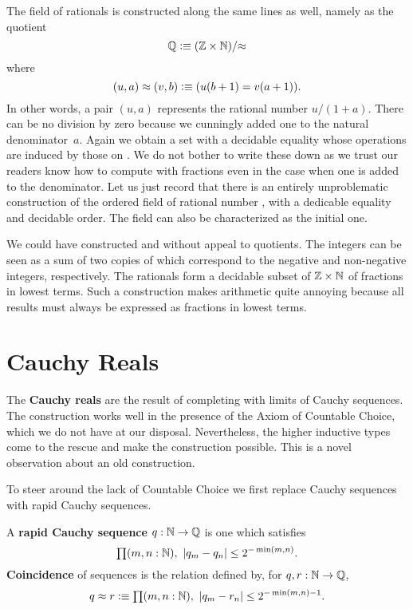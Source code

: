The field of rationals \Q is constructed along the same lines as well, namely as the
quotient
%
\[ \mathbb{Q} \vcentcolon\equiv (\mathbb{Z} \times \mathbb{N})/{\approx} \]
%
where
\[ (u,a) \approx (v,b) \vcentcolon\equiv (u (b + 1) = v (a + 1)). \]
%
In other words, a pair $(u, a)$ represents the rational number $u / (1 + a)$. There can be
no division by zero because we cunningly added one to the natural denominator~$a$. Again
we obtain a set with a decidable equality whose operations are induced by those on \Z. We
do not bother to write these down as we trust our readers know how to compute with
fractions even in the case when one is added to the denominator. Let us just record that
there is an entirely unproblematic construction of the ordered field of rational number
\Q, with a dedicable equality and decidable order. The field \Q can also be characterized
as the initial one.

\begin{rmk}
  We could have constructed \Z and \Q without appeal to quotients. The integers can be
  seen as a sum of two copies of \N which correspond to the negative and non-negative
  integers, respectively. The rationals form a decidable subset of $\mathbb{Z} \times \mathbb{N}$ of
  fractions in lowest terms. Such a construction makes arithmetic quite annoying because
  all results must always be expressed as fractions in lowest terms.
\end{rmk}


\section{Cauchy Reals}
\label{sec:cauchy-reals}

The \textbf{Cauchy reals \RC} are the result of completing \Q with limits of Cauchy
sequences. The construction works well in the presence of the Axiom of Countable Choice,
which we do not have at our disposal. Nevertheless, the higher inductive types come to the
rescue and make the construction possible. This is a novel observation about an old
construction.

To steer around the lack of Countable Choice we first replace Cauchy sequences with rapid
Cauchy sequences.

\begin{defn}\label{defn:rapid-cauchy}
  A \textbf{rapid Cauchy sequence} $q : \mathbb{N} \to \mathbb{Q}$ is one which satisfies
  \[ \prd{m,n:\N} |q_m - q_n| \leq 2^{-\min(m,n)}. \]
  \textbf{Coincidence} of sequences is the relation defined by, for $q, r : \mathbb{N} \to \mathbb{Q}$,
  \[ q \approx r \defeq
     \prd{m,n:\N} |q_m - r_n| \leq 2^{-\min(m,n) - 1}. \]
\end{defn}

